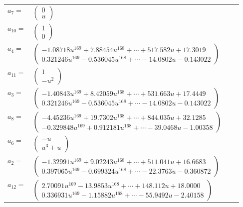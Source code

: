 \documentclass[1p]{elsarticle_modified}
\theoremstyle{definition}
\begin{document}
\begin{tabular}{m{7pt} m{180pt} m{7pt} m{180pt} }
\flushright $a_{7}=$&$\begin{pmatrix}0\\u\end{pmatrix}$ \\
\flushright $a_{10}=$&$\begin{pmatrix}1\\0\end{pmatrix}$ \\
\flushright $a_{4}=$&$\begin{pmatrix}-1.08718 u^{169}+7.88454 u^{168}+\cdots+517.582 u+17.3019\\0.321246 u^{169}-0.536045 u^{168}+\cdots-14.0802 u-0.143022\end{pmatrix}$ \\
\flushright $a_{11}=$&$\begin{pmatrix}1\\- u^2\end{pmatrix}$ \\
\flushright $a_{3}=$&$\begin{pmatrix}-1.40843 u^{169}+8.42059 u^{168}+\cdots+531.663 u+17.4449\\0.321246 u^{169}-0.536045 u^{168}+\cdots-14.0802 u-0.143022\end{pmatrix}$ \\
\flushright $a_{8}=$&$\begin{pmatrix}-4.45236 u^{169}+19.7302 u^{168}+\cdots+844.035 u+32.1285\\-0.329848 u^{169}+0.912181 u^{168}+\cdots-39.0468 u-1.00358\end{pmatrix}$ \\
\flushright $a_{6}=$&$\begin{pmatrix}- u\\u^3+u\end{pmatrix}$ \\
\flushright $a_{2}=$&$\begin{pmatrix}-1.32991 u^{169}+9.02243 u^{168}+\cdots+511.041 u+16.6683\\0.397065 u^{169}-0.699324 u^{168}+\cdots-22.3763 u-0.360872\end{pmatrix}$ \\
\flushright $a_{12}=$&$\begin{pmatrix}2.70091 u^{169}-13.9853 u^{168}+\cdots+148.112 u+18.0000\\0.336931 u^{169}-1.15882 u^{168}+\cdots-55.9492 u-2.40158\end{pmatrix}$ \\

\end{tabular}
\end{document}
